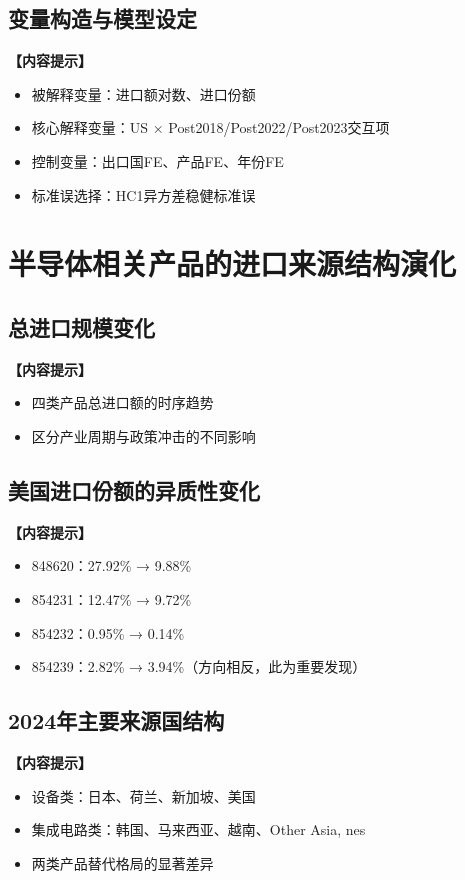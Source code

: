 \documentclass[UTF8,a4paper,12pt]{ctexart}
\begin{document}
\subsection{变量构造与模型设定}
\noindent\textbf{【内容提示】}
\begin{itemize}[nosep]
    \item 被解释变量：进口额对数、进口份额
    \item 核心解释变量：US × Post2018/Post2022/Post2023交互项
    \item 控制变量：出口国FE、产品FE、年份FE
    \item 标准误选择：HC1异方差稳健标准误
\end{itemize}


\section{半导体相关产品的进口来源结构演化}

\subsection{总进口规模变化}
\noindent\textbf{【内容提示】}
\begin{itemize}[nosep]
    \item 四类产品总进口额的时序趋势
    \item 区分产业周期与政策冲击的不同影响
\end{itemize}

\subsection{美国进口份额的异质性变化}
\noindent\textbf{【内容提示】}
\begin{itemize}[nosep]
    \item 848620：27.92\% → 9.88\%
    \item 854231：12.47\% → 9.72\%
    \item 854232：0.95\% → 0.14\%
    \item 854239：2.82\% → 3.94\%（方向相反，此为重要发现）
\end{itemize}

\subsection{2024年主要来源国结构}
\noindent\textbf{【内容提示】}
\begin{itemize}[nosep]
    \item 设备类：日本、荷兰、新加坡、美国
    \item 集成电路类：韩国、马来西亚、越南、Other Asia, nes
    \item 两类产品替代格局的显著差异
\end{itemize}
\end{document}
